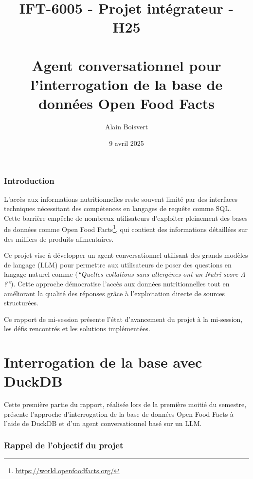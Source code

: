 \documentclass[a4paper,11pt]{article}
\title{IFT-6005 - Projet intégrateur - H25 \\ ~ \\ Agent conversationnel pour l'interrogation de la base de données Open Food Facts}
\author{Alain Boisvert}
\date{9 avril 2025}
\begin{document}

\newpage

\tableofcontents
\newpage

\section{Introduction}  
\label{sec:probleme}

L'accès aux informations nutritionnelles reste souvent limité par des interfaces techniques
nécessitant des compétences en langages de requête comme SQL. Cette barrière empêche de nombreux
utilisateurs d'exploiter pleinement des bases de données 
comme Open Food Facts\footnote{\url{https://world.openfoodfacts.org/}}, 
qui contient des informations détaillées sur des milliers de produits alimentaires. 

Ce projet vise à développer un agent conversationnel utilisant des grands modèles de langage (LLM) 
pour permettre aux utilisateurs de poser des questions en langage naturel 
comme (\textit{\enquote{Quelles collations sans allergènes ont un Nutri-score A ?}}). 
Cette approche démocratise l'accès aux données nutritionnelles tout en améliorant la qualité
des réponses grâce à l'exploitation directe de sources structurées. 

Ce rapport de mi-session présente l'état d'avancement du projet à la mi-session, les défis rencontrés et les solutions implémentées.


\part{Interrogation de la base avec DuckDB}
\label{part:duckdb}

Cette première partie du rapport, réalisée lors de la première moitié du semestre, présente l'approche d'interrogation de la base de données Open Food Facts à l'aide de DuckDB et d'un agent conversationnel basé sur un LLM.


\section{Rappel de l'objectif du projet}
\label{sec:revue}
\end{document}
